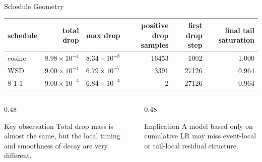 \documentclass[fontset=fandol,aspectratio=169,10pt]{ctexbeamer}
\begin{document}
\begin{frame}{Schedule Geometry}
  \begin{table}
    \centering
    \scriptsize
    \begin{tabular}{lrrrrr}
      \toprule
      schedule & total drop & max drop & positive drop samples & first drop step & final tail saturation\\
      \midrule
      cosine & \(8.98\times 10^{-4}\) & \(8.34\times10^{-8}\) & 16453 & 1002 & 1.000\\
      WSD & \(9.00\times 10^{-4}\) & \(6.79\times10^{-7}\) & 3391 & 27126 & 0.964\\
      8-1-1 & \(9.00\times 10^{-4}\) & \(6.84\times10^{-4}\) & 2 & 27126 & 0.964\\
      \bottomrule
    \end{tabular}
  \end{table}
  \vspace{0.5em}
  \begin{columns}[T,onlytextwidth]
    \begin{column}{0.48\textwidth}
      \begin{block}{Key observation}
        Total drop mass is almost the same, but the \alert{local timing and smoothness} of decay are very different.
      \end{block}
    \end{column}
    \begin{column}{0.48\textwidth}
      \begin{block}{Implication}
        A model based only on cumulative LR may miss event-local or tail-local residual structure.
      \end{block}
    \end{column}
  \end{columns}
\end{frame}
\end{document}
